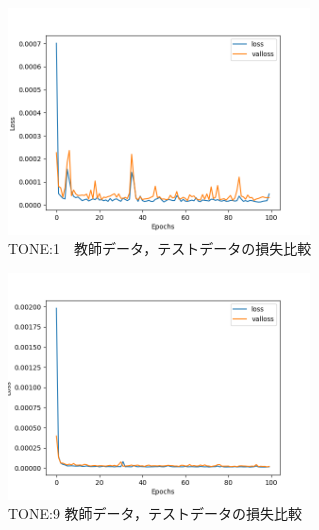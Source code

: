 \documentclass{jreport}		%
\begin{document}
\begin{figure}[htbp]
 \begin{center}
  \includegraphics[width=80mm]{tone1_loss_hikaku.png}
 \end{center}
 \caption{TONE:1　教師データ，テストデータの損失比較}
 \label{fig:one}
\end{figure}

\begin{figure}[htbp]
 \begin{center}
  \includegraphics[width=80mm]{tone10_loss_hikaku.png}
 \end{center}
 \caption{TONE:9 教師データ，テストデータの損失比較}
 \label{fig:one}
\end{figure}
\end{document}
